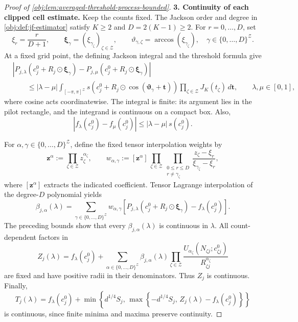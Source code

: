 \documentclass[11pt]{article}
\begin{document}
\begin{proof}[Proof of \cref{obj:lem:averaged-threshold-process-bounded}]
\noindent\textbf{3. Continuity of each clipped cell estimate.}
Keep the counts fixed. The Jackson order and degree in \cref{obj:def:jf-estimator} satisfy \(K\geq2\) and \(D=2(K-1)\geq2\). For \(r=0,\ldots,D\), set
\[
\xi_r=\frac{r}{D+1},
\qquad
\boldsymbol\xi_\gamma=(\xi_{\gamma_\zeta})_{\zeta\in\mathcal Z},
\qquad
\vartheta_{\gamma,\zeta}=\arccos(\xi_{\gamma_\zeta}),
\quad
\gamma\in\{0,\ldots,D\}^{\mathcal Z}.
\]
At a fixed grid point, the defining Jackson integral and the threshold formula give
\[
\begin{aligned}
&\left|
P_{j,\lambda}(c_j^0+R_j\odot\boldsymbol\xi_\gamma)
-P_{j,\mu}(c_j^0+R_j\odot\boldsymbol\xi_\gamma)
\right|\\
&\qquad\leq |\lambda-\mu|
\int_{[-\pi,\pi]^{\mathcal Z}}
s\!\left(c_j^0+R_j\odot
\cos(\boldsymbol\vartheta_\gamma+\boldsymbol t)\right)
\prod_{\zeta\in\mathcal Z}J_K(t_\zeta)\,d\boldsymbol t,
\qquad \lambda,\mu\in[0,1],
\end{aligned}
\]
where cosine acts coordinatewise. The integral is finite: its argument lies in the pilot rectangle, and the integrand is continuous on a compact box. Also,
\[
|f_\lambda(c_j^0)-f_\mu(c_j^0)|
\leq |\lambda-\mu|\,s(c_j^0).
\]

For \(\alpha,\gamma\in\{0,\ldots,D\}^{\mathcal Z}\), define the fixed tensor interpolation weights by
\[
\boldsymbol z^\alpha:=\prod_{\zeta\in\mathcal Z}z_\zeta^{\alpha_\zeta},
\qquad
w_{\alpha,\gamma}:=
[\boldsymbol z^\alpha]\,
\prod_{\zeta\in\mathcal Z}
\prod_{\substack{0\leq r\leq D\\r\ne\gamma_\zeta}}
\frac{z_\zeta-\xi_r}{\xi_{\gamma_\zeta}-\xi_r},
\]
where \([\boldsymbol z^\alpha]\) extracts the indicated coefficient. Tensor Lagrange interpolation of the degree-\(D\) polynomial yields
\[
\beta_{j,\alpha}(\lambda)
=
\sum_{\gamma\in\{0,\ldots,D\}^{\mathcal Z}}
w_{\alpha,\gamma}
\left[
P_{j,\lambda}(c_j^0+R_j\odot\boldsymbol\xi_\gamma)
-f_\lambda(c_j^0)
\right].
\]
The preceding bounds show that every \(\beta_{j,\alpha}(\lambda)\) is continuous in \(\lambda\). All count-dependent factors in
\[
Z_j(\lambda)=f_\lambda(c_j^0)+
\sum_{\alpha\in\{0,\ldots,D\}^{\mathcal Z}}
\beta_{j,\alpha}(\lambda)
\prod_{\zeta\in\mathcal Z}
\frac{U_{\alpha_\zeta}(N_{\zeta j};c^0_{\zeta j})}
     {R_{\zeta j}^{\alpha_\zeta}}
\]
are fixed and have positive radii in their denominators. Thus \(Z_j\) is continuous. Finally,
\[
T_j(\lambda)=f_\lambda(c_j^0)+
\min\!\left\{d^{1/4}S_j,\,
\max\!\left\{-d^{1/4}S_j,\,
Z_j(\lambda)-f_\lambda(c_j^0)\right\}\right\}
\]
is continuous, since finite minima and maxima preserve continuity.


\end{proof}
\end{document}
